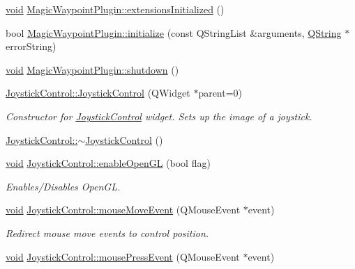 \begin{DoxyCompactItemize}
\item 
\hyperlink{group___u_a_v_objects_plugin_ga444cf2ff3f0ecbe028adce838d373f5c}{void} \hyperlink{group___g_c_s_control_gadget_plugin_gaf45230b46b95ad6f1a8f74dc1023b94a}{\-Magic\-Waypoint\-Plugin\-::extensions\-Initialized} ()
\item 
bool \hyperlink{group___g_c_s_control_gadget_plugin_ga2c2d28520438e765c6e3ba288777e894}{\-Magic\-Waypoint\-Plugin\-::initialize} (const \-Q\-String\-List \&arguments, \hyperlink{group___u_a_v_objects_plugin_gab9d252f49c333c94a72f97ce3105a32d}{\-Q\-String} $\ast$error\-String)
\item 
\hyperlink{group___u_a_v_objects_plugin_ga444cf2ff3f0ecbe028adce838d373f5c}{void} \hyperlink{group___g_c_s_control_gadget_plugin_gaa9be91fd32c41e37bfdbd77c2420373f}{\-Magic\-Waypoint\-Plugin\-::shutdown} ()
\item 
\hyperlink{group___g_c_s_control_gadget_plugin_ga77373f65ad7f3da249f63ebd5d64a736}{\-Joystick\-Control\-::\-Joystick\-Control} (\-Q\-Widget $\ast$parent=0)
\begin{DoxyCompactList}\small\item\em \-Constructor for \hyperlink{class_joystick_control}{\-Joystick\-Control} widget. \-Sets up the image of a joystick. \end{DoxyCompactList}\item 
\hyperlink{group___g_c_s_control_gadget_plugin_gafb2a1d3ac608e7378bba52d774b825d0}{\-Joystick\-Control\-::$\sim$\-Joystick\-Control} ()
\item 
\hyperlink{group___u_a_v_objects_plugin_ga444cf2ff3f0ecbe028adce838d373f5c}{void} \hyperlink{group___g_c_s_control_gadget_plugin_ga4737e633732c138c5ad259f7fe0a0e04}{\-Joystick\-Control\-::enable\-Open\-G\-L} (bool flag)
\begin{DoxyCompactList}\small\item\em \-Enables/\-Disables \-Open\-G\-L. \end{DoxyCompactList}\item 
\hyperlink{group___u_a_v_objects_plugin_ga444cf2ff3f0ecbe028adce838d373f5c}{void} \hyperlink{group___g_c_s_control_gadget_plugin_ga4522aafc5f2b7dae7d64ac4368189272}{\-Joystick\-Control\-::mouse\-Move\-Event} (\-Q\-Mouse\-Event $\ast$event)
\begin{DoxyCompactList}\small\item\em \-Redirect mouse move events to control position. \end{DoxyCompactList}\item 
\hyperlink{group___u_a_v_objects_plugin_ga444cf2ff3f0ecbe028adce838d373f5c}{void} \hyperlink{group___g_c_s_control_gadget_plugin_ga8d3df6f8f57869a8e862f3844766ad72}{\-Joystick\-Control\-::mouse\-Press\-Event} (\-Q\-Mouse\-Event $\ast$event)

\end{DoxyCompactItemize}
